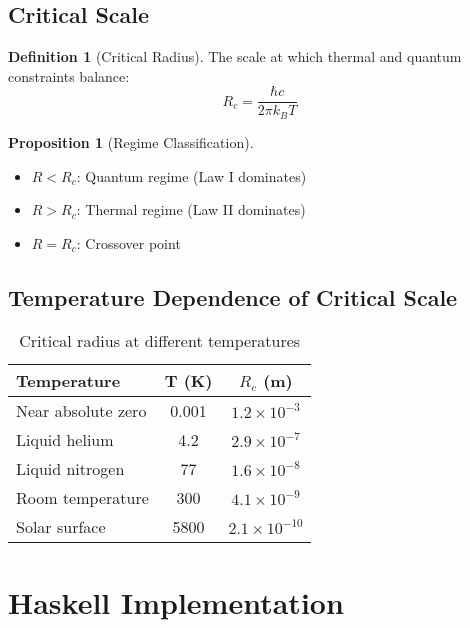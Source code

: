 \documentclass[11pt,a4paper]{article}
\theoremstyle{definition}
\newtheorem{definition}{Definition}[section]
\newtheorem{proposition}[theorem]{Proposition}
\begin{document}
\subsection{Critical Scale}

\begin{definition}[Critical Radius]
The scale at which thermal and quantum constraints balance:
\begin{equation}
R_c = \frac{\hbar c}{2\pi k_B T}
\end{equation}
\end{definition}

\begin{proposition}[Regime Classification]
\begin{itemize}
\item $R < R_c$: Quantum regime (Law I dominates)
\item $R > R_c$: Thermal regime (Law II dominates)
\item $R = R_c$: Crossover point
\end{itemize}
\end{proposition}

\subsection{Temperature Dependence of Critical Scale}

\begin{table}[h]
\centering
\begin{tabular}{|l|c|c|}
\hline
\textbf{Temperature} & \textbf{T (K)} & \textbf{$R_c$ (m)} \\
\hline
Near absolute zero & 0.001 & $1.2 \times 10^{-3}$ \\
Liquid helium & 4.2 & $2.9 \times 10^{-7}$ \\
Liquid nitrogen & 77 & $1.6 \times 10^{-8}$ \\
Room temperature & 300 & $4.1 \times 10^{-9}$ \\
Solar surface & 5800 & $2.1 \times 10^{-10}$ \\
\hline
\end{tabular}
\caption{Critical radius at different temperatures}
\end{table}

\section{Haskell Implementation}
\end{document}
